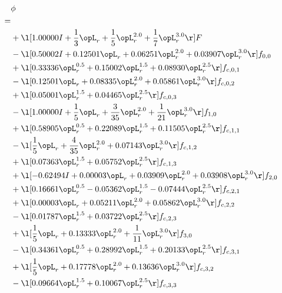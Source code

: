 \begin{alignat}{2} 
\label{eq:scalarFlux_0} 
& \phi \nonumber \\ 
 = \\ 
& + \l[  1.00000 I + \frac{1}{3} \opL_r + \frac{1}{5} \opL_r^{2.0} + \frac{1}{7} \opL_r^{3.0}  \r] F \nonumber \\ 
& - \l[  0.50002 I +  0.12501 \opL_r +  0.06251 \opL_r^{2.0} +  0.03907 \opL_r^{3.0}  \r] f_{0,0} \nonumber \\ 
& + \l[  0.33336 \opL_r^{0.5} +  0.15002 \opL_r^{1.5} +  0.08930 \opL_r^{2.5}  \r] f_{c,0,1} \nonumber \\ 
& - \l[  0.12501 \opL_r +  0.08335 \opL_r^{2.0} +  0.05861 \opL_r^{3.0}  \r] f_{c,0,2} \nonumber \\ 
& + \l[  0.05001 \opL_r^{1.5} +  0.04465 \opL_r^{2.5}  \r] f_{c,0,3} \nonumber \\ 
& - \l[  1.00000 I + \frac{1}{5} \opL_r + \frac{3}{35} \opL_r^{2.0} + \frac{1}{21} \opL_r^{3.0}  \r] f_{1,0} \nonumber \\ 
& + \l[  0.58905 \opL_r^{0.5} +  0.22089 \opL_r^{1.5} +  0.11505 \opL_r^{2.5}  \r] f_{c,1,1} \nonumber \\ 
& - \l[ \frac{1}{5} \opL_r + \frac{4}{35} \opL_r^{2.0} +  0.07143 \opL_r^{3.0}  \r] f_{c,1,2} \nonumber \\ 
& + \l[  0.07363 \opL_r^{1.5} +  0.05752 \opL_r^{2.5}  \r] f_{c,1,3} \nonumber \\ 
& + \l[  -0.62494 I +  0.00003 \opL_r +  0.03909 \opL_r^{2.0} +  0.03908 \opL_r^{3.0}  \r] f_{2,0} \nonumber \\ 
& + \l[  0.16661 \opL_r^{0.5}   -0.05362 \opL_r^{1.5}   -0.07444 \opL_r^{2.5}  \r] f_{c,2,1} \nonumber \\ 
& + \l[  0.00003 \opL_r +  0.05211 \opL_r^{2.0} +  0.05862 \opL_r^{3.0}  \r] f_{c,2,2} \nonumber \\ 
& - \l[  0.01787 \opL_r^{1.5} +  0.03722 \opL_r^{2.5}  \r] f_{c,2,3} \nonumber \\ 
& + \l[ \frac{1}{5} \opL_r +  0.13333 \opL_r^{2.0} + \frac{1}{11} \opL_r^{3.0}  \r] f_{3,0} \nonumber \\ 
& - \l[  0.34361 \opL_r^{0.5} +  0.28992 \opL_r^{1.5} +  0.20133 \opL_r^{2.5}  \r] f_{c,3,1} \nonumber \\ 
& + \l[ \frac{1}{5} \opL_r +  0.17778 \opL_r^{2.0} +  0.13636 \opL_r^{3.0}  \r] f_{c,3,2} \nonumber \\ 
& - \l[  0.09664 \opL_r^{1.5} +  0.10067 \opL_r^{2.5}  \r] f_{c,3,3} \nonumber \\ 
\end{alignat} 



